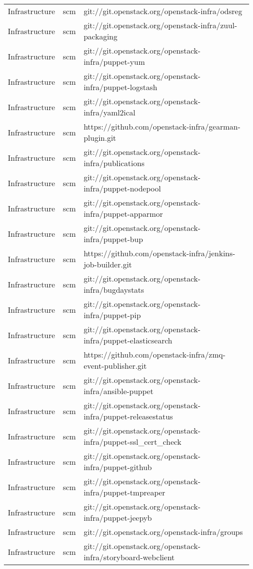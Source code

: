 \begin{center}
\begin{longtable}{|p{4cm}|p{1cm}|p{10cm}|}
Infrastructure&scm&git://git.openstack.org/openstack-infra/odsreg\\ 
Infrastructure&scm&git://git.openstack.org/openstack-infra/zuul-packaging\\ 
Infrastructure&scm&git://git.openstack.org/openstack-infra/puppet-yum\\ 
Infrastructure&scm&git://git.openstack.org/openstack-infra/puppet-logstash\\ 
Infrastructure&scm&git://git.openstack.org/openstack-infra/yaml2ical\\ 
Infrastructure&scm&https://github.com/openstack-infra/gearman-plugin.git\\ 
Infrastructure&scm&git://git.openstack.org/openstack-infra/publications\\ 
Infrastructure&scm&git://git.openstack.org/openstack-infra/puppet-nodepool\\ 
Infrastructure&scm&git://git.openstack.org/openstack-infra/puppet-apparmor\\ 
Infrastructure&scm&git://git.openstack.org/openstack-infra/puppet-bup\\ 
Infrastructure&scm&https://github.com/openstack-infra/jenkins-job-builder.git\\ 
Infrastructure&scm&git://git.openstack.org/openstack-infra/bugdaystats\\ 
Infrastructure&scm&git://git.openstack.org/openstack-infra/puppet-pip\\ 
Infrastructure&scm&git://git.openstack.org/openstack-infra/puppet-elasticsearch\\ 
Infrastructure&scm&https://github.com/openstack-infra/zmq-event-publisher.git\\ 
Infrastructure&scm&git://git.openstack.org/openstack-infra/ansible-puppet\\ 
Infrastructure&scm&git://git.openstack.org/openstack-infra/puppet-releasestatus\\ 
Infrastructure&scm&git://git.openstack.org/openstack-infra/puppet-ssl\_cert\_check\\ 
Infrastructure&scm&git://git.openstack.org/openstack-infra/puppet-github\\ 
Infrastructure&scm&git://git.openstack.org/openstack-infra/puppet-tmpreaper\\ 
Infrastructure&scm&git://git.openstack.org/openstack-infra/puppet-jeepyb\\ 
Infrastructure&scm&git://git.openstack.org/openstack-infra/groups\\ 
Infrastructure&scm&git://git.openstack.org/openstack-infra/storyboard-webclient\\ 

\end{longtable}
\end{center}
